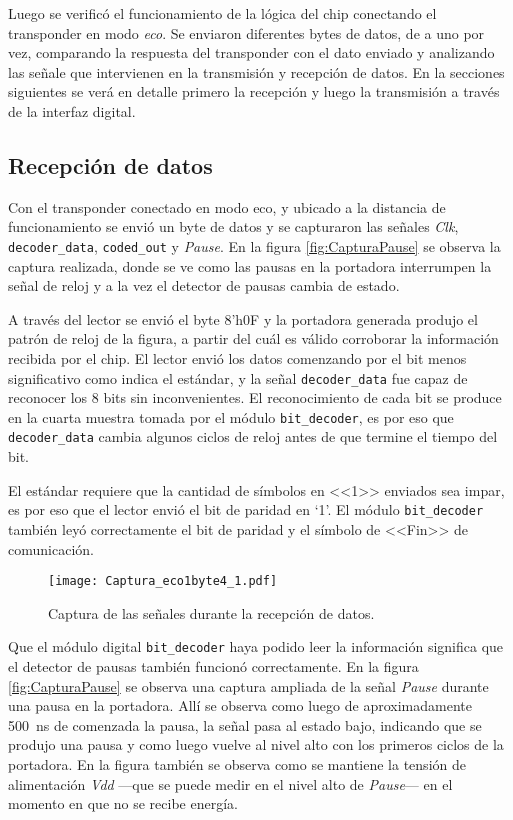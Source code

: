 Luego se verificó el funcionamiento de la lógica del chip conectando 
el transponder en modo \emph{eco}. Se enviaron diferentes bytes de 
datos, de a uno por vez, comparando la respuesta del transponder con 
el dato enviado y analizando las señale que intervienen en la 
transmisión y recepción de datos. En la secciones siguientes se verá 
en detalle primero la recepción y luego la transmisión a través de 
la interfaz digital.


\subsection{Recepción de datos}

Con el transponder conectado en modo eco, y ubicado a la distancia de 
funcionamiento se envió un byte de datos y se capturaron las señales 
\emph{Clk}, \lstinline{decoder_data}, \lstinline{coded_out} y 
\emph{Pause}. En la figura \ref{fig:CapturaPause} se observa la 
captura realizada, donde se ve como las pausas en la portadora 
interrumpen la señal de reloj y a la vez el detector de pausas cambia 
de estado. 

A través del lector se envió el byte 8'h0F y la portadora 
generada produjo el patrón de reloj de la figura, a partir del cuál es 
válido corroborar la información recibida por el chip. El lector 
envió los datos comenzando por el bit menos significativo como indica 
el estándar, y la señal \lstinline{decoder_data} fue capaz de reconocer
los 8 bits  sin inconvenientes. El reconocimiento de cada bit se 
produce en la cuarta muestra tomada por el módulo 
\lstinline{bit_decoder}, es por eso que \lstinline{decoder_data} 
cambia algunos ciclos de reloj antes de que termine el tiempo del bit.

El estándar requiere que la cantidad de símbolos en <<1>> enviados 
sea impar, es por eso que el lector envió el bit de paridad en `1'. El 
módulo \lstinline{bit_decoder} también leyó correctamente el bit de 
paridad y el símbolo de <<Fin>> de comunicación.

\begin{figure}
	\centering
	\texttt{[image: Captura\_eco1byte4\_1.pdf]}
	\caption{Captura de las señales durante la recepción de datos.}
	\label{fig:CapturaRecepcionDatos}
\end{figure}

Que el módulo digital \lstinline{bit_decoder} haya podido leer la 
información significa que el detector de pausas también funcionó 
correctamente. En la figura \ref{fig:CapturaPause} se observa una 
captura ampliada de la señal \emph{Pause} durante una pausa en la 
portadora. Allí se observa como luego de aproximadamente 
\SI{500}{\nano\second} de comenzada la pausa, la señal pasa al estado 
bajo, indicando que se produjo una pausa y como luego vuelve al nivel 
alto con los primeros ciclos de la portadora. En la figura también se 
observa como se mantiene la tensión de alimentación \emph{Vdd} ---que 
se puede medir en el nivel alto de \emph{Pause}--- en el momento en 
que no se recibe energía.

